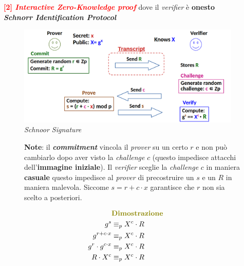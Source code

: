 \begin{flushleft}

    \textcolor{red}{\textbf{[2] \textit{Interactive Zero-Knowledge proof}}} dove il \textit{verifier} è \textbf{onesto} \\
    \textbf{\textit{Schnorr Identification Protocol}}

    \begin{figure}[h]
        \centering
        \includegraphics[width=0.95\textwidth]{img/schnorr_ip.png}
        \caption{\textit{Schnoor Signature}}
        \label{fig:schnorr_ip}
    \end{figure}

    \begin{figure}[h]
        \centering
        \begin{minipage}[c]{0.45\textwidth}
            \textbf{Note}: il \textbf{\textit{commitment}} vincola il \textit{prover} su un certo $r$ e non può cambiarlo dopo aver visto la \textit{challenge} $c$ (questo impedisce attacchi dell'\textbf{immagine iniziale}). Il \textit{verifier} sceglie la \textit{challenge} $c$ in maniera \textbf{casuale} questo impedisce al \textit{prover} di precostruire un $s$ e un $R$ in maniera malevola. Siccome $s = r + c \cdot x$ garantisce che $r$ non sia scelto a posteriori.
        \end{minipage}
        \hfill
        \begin{minipage}[c]{0.45\textwidth}
            \begin{align*}
                & \textcolor{olive}{\textbf{Dimostrazione}} \quad & \\
                g^s &\equiv_p X^c \cdot R \\
                g^{r + c \cdot x} &\equiv_p X^c \cdot R \\
                g^r \cdot g^{c \cdot x} &\equiv_p X^c \cdot R \\
                R \cdot X^c &\equiv_p X^c \cdot R
            \end{align*}
        \end{minipage}
    \end{figure}


\end{flushleft}
